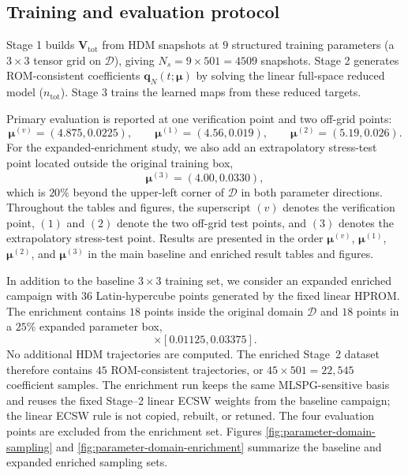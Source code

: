 \documentclass[11pt]{article}
\begin{document}
\subsection{Training and evaluation protocol}
Stage 1 builds $\mathbf V_{\mathrm{tot}}$ from HDM snapshots at $9$ structured
training parameters (a $3\times3$ tensor grid on $\mathcal D$), giving
$N_s=9\times501=4509$ snapshots. Stage 2 generates ROM-consistent coefficients
$\mathbf q_N(t;\bm\mu)$ by solving the linear full-space reduced model
($n_{\mathrm{tot}}$). Stage 3 trains the learned maps from these reduced
targets.

Primary evaluation is reported at one verification point and two off-grid
points:
\begin{equation}
\bm\mu^{(v)}=(4.875,0.0225),\qquad
\bm\mu^{(1)}=(4.56,0.019),\qquad
\bm\mu^{(2)}=(5.19,0.026).
\end{equation}
For the expanded-enrichment study, we also add an extrapolatory stress-test
point located outside the original training box,
\begin{equation}
\bm\mu^{(3)}=(4.00,0.0330),
\end{equation}
which is $20\%$ beyond the upper-left corner of $\mathcal D$ in both parameter
directions. Throughout the tables and figures, the superscript $(v)$ denotes
the verification point, $(1)$ and $(2)$ denote the two off-grid test points,
and $(3)$ denotes the extrapolatory stress-test point. Results are presented in
the order $\bm\mu^{(v)}$, $\bm\mu^{(1)}$, $\bm\mu^{(2)}$, and
$\bm\mu^{(3)}$ in the main baseline and enriched result tables and figures.

In addition to the baseline $3\times3$ training set, we consider an expanded
enriched campaign with $36$ Latin-hypercube points generated by the fixed
linear HPROM.  The enrichment contains $18$ points inside the original domain
$\mathcal D$ and $18$ points in a $25\%$ expanded parameter box,
\begin{equation}
[3.9375,5.8125]\times[0.01125,0.03375].
\end{equation}
No additional HDM trajectories are computed.  The enriched Stage~2 dataset
therefore contains $45$ ROM-consistent trajectories, or
$45\times501=22{,}545$ coefficient samples.  The enrichment run keeps the same
MLSPG-sensitive basis and reuses the fixed Stage--2 linear ECSW weights from
the baseline campaign; the linear ECSW rule is not copied, rebuilt, or retuned.
The four evaluation points are excluded from the enrichment set.  Figures
\ref{fig:parameter-domain-sampling} and
\ref{fig:parameter-domain-enrichment} summarize the baseline and expanded
enriched sampling sets.
\end{document}
